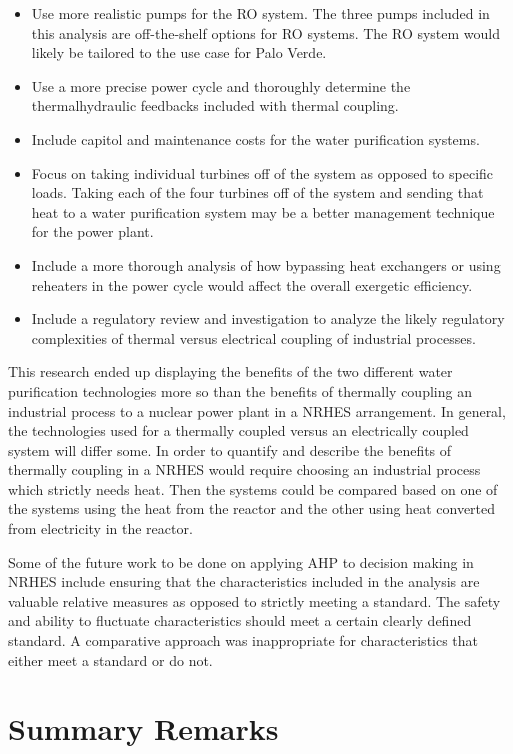 \begin{itemize}
\item Use more realistic pumps for the RO system.  The three pumps included in this analysis are off-the-shelf options for RO systems.  The RO system would likely be tailored to the use case for Palo Verde.
\item Use a more precise power cycle and thoroughly determine the thermalhydraulic feedbacks included with thermal coupling.
\item Include capitol and maintenance costs for the water purification systems.
\item Focus on taking individual turbines off of the system as opposed to specific loads.  Taking each of the four turbines off of the system and sending that heat to a water purification system may be a better management technique for the power plant.
\item Include a more thorough analysis of how bypassing heat exchangers or using reheaters in the power cycle would affect the overall exergetic efficiency.
\item Include a regulatory review and investigation to analyze the likely regulatory complexities of thermal versus electrical coupling of industrial processes.
\end{itemize}

This research ended up displaying the benefits of the two different water purification technologies more so than the benefits of thermally coupling an industrial process to a nuclear power plant in a NRHES arrangement.  In general, the technologies used for a thermally coupled versus an electrically coupled system will differ some. In order to quantify and describe the benefits of thermally coupling in a NRHES would require choosing an industrial process which strictly needs heat. Then the systems could be compared based on one of the systems using the heat from the reactor and the other using heat converted from electricity in the reactor.

Some of the future work to be done on applying AHP to decision making in NRHES include ensuring that the characteristics included in the analysis are valuable relative measures as opposed to strictly meeting a standard. The safety and ability to fluctuate characteristics should meet a certain clearly defined standard.  A comparative approach was inappropriate for characteristics that either meet a standard or do not.

\section{Summary Remarks}


